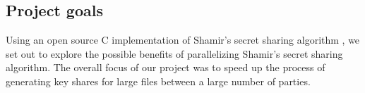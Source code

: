 \documentclass[main.tex]{subfiles}
\begin{document}

\subsection{Project goals}

\indent Using an open source C implementation of Shamir's secret sharing algorithm \cite{one}, we set out to explore the possible benefits of parallelizing Shamir's secret sharing algorithm.  The overall focus of our project was to speed up the process of generating key shares for large files between a large number of parties.

\end{document}
